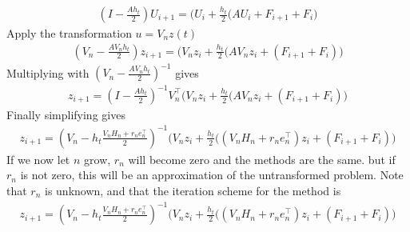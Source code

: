 \begin{equation}
\begin{aligned}
(I-\frac{Ah_t}{2}) U_{i+1} = \Big( U_i + \frac{h_t}{2} \big( A U_i + F_{i+1} +F_{i} \big)
\end{aligned}
\end{equation}
Apply the transformation $ u = V_n z(t) $
\begin{equation}
\begin{aligned}
(V_n-\frac{A V_n h_t}{2}) z_{i+1} = \Big( V_n z_i + \frac{h_t}{2} \big( A V_n z_i + (F_{i+1} +F_{i}) \big)
\end{aligned}
\end{equation}
Multiplying with $(V_n-\frac{A V_n h_t}{2})^{-1}$ gives
\begin{equation}
\begin{aligned}
z_{i+1} = (I-\frac{Ah_t}{2})^{-1} V_n^\top \Big( V_n z_i + \frac{h_t}{2} \big( A V_n z_i + (F_{i+1} +F_{i}) \big)
\end{aligned}
\end{equation}
Finally simplifying gives
\begin{equation}
\begin{aligned}
z_{i+1} = (V_n- h_t \frac{V_n H_n + r_n e_n^\top }{2})^{-1} \Big( V_n z_i + \frac{h_t}{2} \big( (V_n H_n + r_n e_n^\top) z_i + (F_{i+1} +F_{i}) \big)
\end{aligned}
\end{equation}
If we now let $n$ grow, $r_n$ will become zero and the methods are the same. but if $r_n$ is not zero, this will be an approximation of the untransformed problem. Note that $r_n$ is unknown, and that the iteration scheme for the method is 
\begin{equation}
\begin{aligned}
z_{i+1} = (V_n- h_t \frac{V_n H_n + r_n e_n^\top }{2})^{-1} \Big( V_n z_i + \frac{h_t}{2} \big( (V_n H_n + r_n e_n^\top) z_i + (F_{i+1} +F_{i}) \big)
\end{aligned}
\end{equation}





